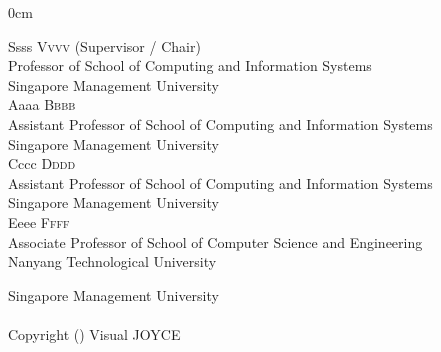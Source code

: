 \documentclass[a4paper,12pt,singleside]{report}
\def\authorname{Visual JOYCE}
\begin{document}
\begin{titlepage}
\begin{addmargin}[2.5cm]{0cm}
    \begin{singlespace}
        Ssss \textsc{Vvvv} (Supervisor / Chair)\\
        Professor of School of Computing and Information Systems\\
        Singapore Management University
        \\[0.5cm]
        Aaaa \textsc{Bbbb} \\
        Assistant  Professor of School of Computing and Information Systems\\
        Singapore Management University
        \\[0.5cm]
        Cccc \textsc{Dddd}\\
        Assistant Professor of School of Computing and Information Systems\\
        Singapore Management University 
        \\[0.5cm]
        Eeee \textsc{Ffff}\\
        Associate Professor of School of Computer Science and Engineering \\
        Nanyang Technological University \\
    \end{singlespace}
\end{addmargin}

\begin{center}
\vfill {\large Singapore Management University\\\vspace{-3pt}\the\year}\\
\vspace*{0.2cm}
{Copyright (\the\year) \authorname}
\end{center}
\end{titlepage}


\cleanlookdateon%
\end{document}
